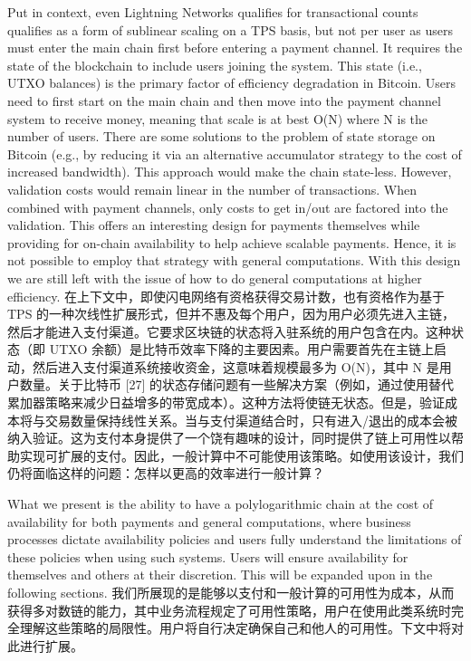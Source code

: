 \documentclass{ctexart}
\begin{document}
Put in context, even Lightning Networks qualifies for transactional counts qualifies as a form of sublinear scaling on a TPS basis, but not per user as users must enter the main chain first before entering a payment channel. It requires the state of the blockchain to include users joining the system. This state (i.e., UTXO balances) is the primary  factor of efficiency degradation in Bitcoin. Users need to first start on the main chain and then move into the payment channel system to receive money, meaning that scale is at best O(N) where N is the number of users. There are some solutions to the problem of state storage on Bitcoin \cite{Dry19} (e.g., by reducing it via an alternative accumulator strategy to the cost of increased bandwidth). This approach would make the chain state-less. However, validation costs would remain linear in the number of transactions. When combined with payment channels, only costs to get in/out are factored into the validation. This offers an interesting design for payments themselves while providing for on-chain availability to help achieve scalable payments. Hence, it is not possible to employ that strategy with general computations. With this design we are still left with the issue of how to do general computations at higher efficiency. 在上下文中，即使闪电网络有资格获得交易计数，也有资格作为基于 TPS 的一种次线性扩展形式，但并不惠及每个用户，因为用户必须先进入主链，然后才能进入支付渠道。它要求区块链的状态将入驻系统的用户包含在内。这种状态（即 UTXO 余额）是比特币效率下降的主要因素。用户需要首先在主链上启动，然后进入支付渠道系统接收资金，这意味着规模最多为 O(N)，其中 N 是用户数量。关于比特币 [27] 的状态存储问题有一些解决方案（例如，通过使用替代累加器策略来减少日益增多的带宽成本）。这种方法将使链无状态。但是，验证成本将与交易数量保持线性关系。当与支付渠道结合时，只有进入/退出的成本会被纳入验证。这为支付本身提供了一个饶有趣味的设计，同时提供了链上可用性以帮助实现可扩展的支付。因此，一般计算中不可能使用该策略。如使用该设计，我们仍将面临这样的问题：怎样以更高的效率进行一般计算？

What we present is the ability to have a polylogarithmic chain at the cost of availability for both payments and general computations, where business processes dictate availability policies and users fully understand the limitations of these policies when using such systems. Users will ensure availability for themselves and others at their discretion.  This will be expanded upon in the following sections. 我们所展现的是能够以支付和一般计算的可用性为成本，从而获得多对数链的能力，其中业务流程规定了可用性策略，用户在使用此类系统时完全理解这些策略的局限性。用户将自行决定确保自己和他人的可用性。下文中将对此进行扩展。
\end{document}
